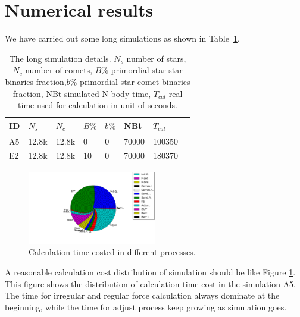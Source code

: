 \documentclass[usenatbib]{mn2e}
\begin{document}


\section{Numerical results}\label{section:results}

We have carried out some long simulations as shown in Table~\ref{table:details}.

\begin{table}
\caption{The long simulation details. $N_{s}$ number of stars, $ N_{c}$ number of comets, $B\%$ primordial star-star binaries fraction,$b\%$ primordial star-comet binaries fraction, NBt simulated N-body time, $T_{cal}$ real time used for calculation in unit of seconds. \label{table:details}}
\begin{tabular}{llllllll}
\hline
\hline ID        &   $N_{s}$    &   $N_{c}$ &  $B\%$  &    $b\%$    &      NBt      & $T_{cal}$        \\
\hline A5      &   12.8k     &   12.8k     &    0        &    0             &      70000  &      100350      \\
\hline E2      &   12.8k     &   12.8k     &    10      &    0             &      70000  &      180370      \\
\hline
\hline
\end{tabular}
\end{table}

\begin{figure}
  \centering
  \includegraphics[width=0.5\textwidth,height=!]{PE.pdf}
  \caption{Calculation time costed in different processes.}
  \label{fig:PE}
\end{figure}

A reasonable calculation cost distribution of simulation should be like Figure  \ref{fig:PE}. This figure shows the distribution of calculation time cost in  the simulation A5. The time for irregular and regular force calculation always dominate at the beginning, while the time for adjust process keep growing as simulation goes.
\end{document}
